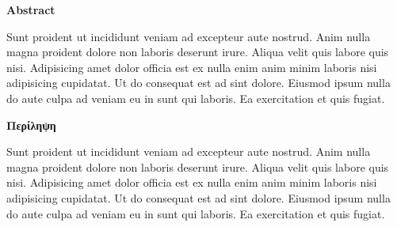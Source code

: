 \pagestyle{empty}
{\textbf{Abstract}\\[1cm]}

Sunt proident ut incididunt veniam ad excepteur aute nostrud. Anim nulla magna proident dolore non laboris deserunt irure. 
Aliqua velit quis labore quis nisi. Adipisicing amet dolor officia est ex nulla enim anim minim laboris nisi adipisicing cupidatat. 
Ut do consequat est ad sint dolore. Eiusmod ipsum nulla do aute culpa ad veniam eu in sunt qui laboris. Ea exercitation et quis fugiat.


\newpage
\pagestyle{empty}
{\textbf{Περίληψη}\\[1cm]}

Sunt proident ut incididunt veniam ad excepteur aute nostrud. Anim nulla magna proident dolore non laboris deserunt irure. 
Aliqua velit quis labore quis nisi. Adipisicing amet dolor officia est ex nulla enim anim minim laboris nisi adipisicing cupidatat. 
Ut do consequat est ad sint dolore. Eiusmod ipsum nulla do aute culpa ad veniam eu in sunt qui laboris. Ea exercitation et quis fugiat.
